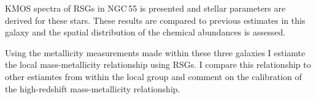 KMOS spectra of RSGs in NGC\,55 is presented and stellar parameters
are derived for these stars.
These results are compared to previous estimates in this galaxy and the spatial
distribution of the chemical abundances is assessed.

Using the metallicity measurements made within these three galaxies I estiamte
the local mass-metallicity relationship using RSGs.
I compare this relationship to other estiamtes from within the local group and
comment on the calibration of the high-redshift mass-metallicity relationship.







